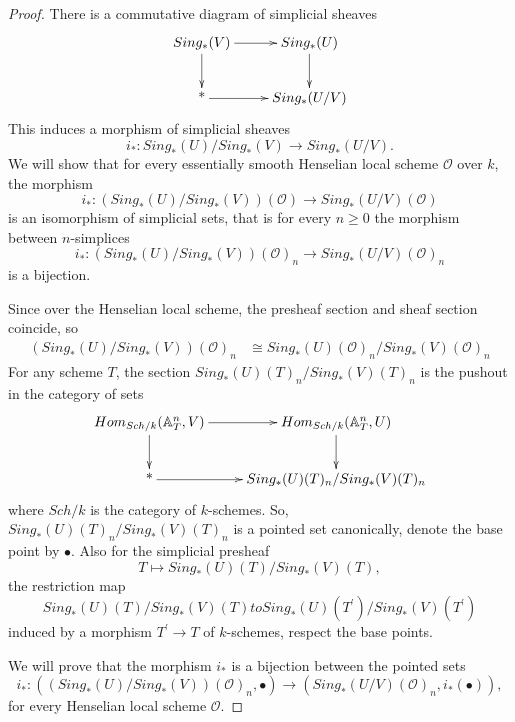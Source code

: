 \documentclass[10pt,a4paper]{amsart}
\newcommand{\A}{{\mathbb A}}
\newcommand{\Spec}{{\rm Spec \,}}
\newcommand{\sO}{{\mathcal O}}
\begin{document}
\begin{proof}
There is a commutative diagram of simplicial sheaves
  \[
\xymatrix{
Sing_*(V) \ar[r] \ar[d] & Sing_*(U) \ar[d] \\
\text{*} \ar[r] & Sing_*(U/V)
}
\]
This induces a morphism of simplicial sheaves
$$i_*: Sing_*(U)/Sing_*(V) \to Sing_*(U/V).$$
We will show that for every essentially smooth Henselian local scheme $\mathcal{O}$ over $k$, the morphism
$$i_*: (Sing_*(U)/Sing_*(V))(\mathcal{O}) \to Sing_*(U/V)(\mathcal{O})$$
is an isomorphism of simplicial sets, that is for every $n \geq 0$ the morphism between $n$-simplices
$$i_*: (Sing_*(U)/Sing_*(V))(\mathcal{O})_n \to Sing_*(U/V)(\mathcal{O})_n$$
is a bijection.

Since over the Henselian local scheme, the presheaf section and sheaf section coincide, so
\begin{align*}
(Sing_*(U)/Sing_*(V))(\mathcal{O})_n & \cong Sing_*(U)(\sO)_n/Sing_*(V)(\sO)_n
\end{align*}
For any scheme $T$, the section $Sing_*(U)(T)_n/Sing_*(V)(T)_n$ is the pushout in the category of sets
 \[
\xymatrix{
Hom_{Sch/k}(\A^n_T, V) \ar[r] \ar[d] & Hom_{Sch/k}(\A^n_T, U) \ar[d] \\
\text{*} \ar[r] & Sing_*(U)(T)_n/Sing_*(V)(T)_n
}
\]
where $Sch/k$ is the category of $k$-schemes. So, $Sing_*(U)(T)_n/Sing_*(V)(T)_n$ is a pointed set canonically, denote the base point by $\bullet$. Also for the simplicial presheaf 
$$T \mapsto Sing_*(U)(T)/Sing_*(V)(T),$$
the restriction map
$$Sing_*(U)(T)/Sing_*(V)(T) to Sing_*(U)(T^\prime)/Sing_*(V)(T^\prime)$$
induced by a morphism $T^\prime \to T$ of $k$-schemes, respect the base points.

We will prove that the morphism  $i_*$ is a bijection between the pointed sets
$$i_*: ((Sing_*(U)/Sing_*(V))(\mathcal{O})_n, \bullet) \to (Sing_*(U/V)(\mathcal{O})_n, i_*(\bullet)),$$
for every Henselian local scheme $\sO$.




\end{proof}
\end{document}
